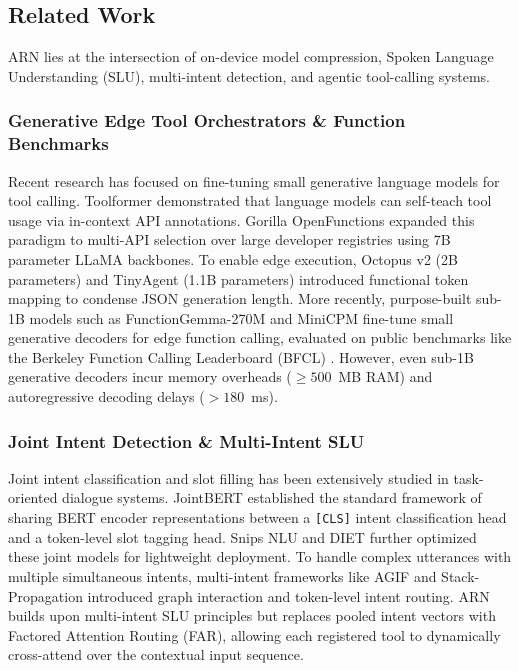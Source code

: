 \documentclass[conference]{IEEEtran}
\begin{document}
\subsection{Related Work}

ARN lies at the intersection of on-device model compression, Spoken Language Understanding (SLU), multi-intent detection, and agentic tool-calling systems.

\subsubsection{Generative Edge Tool Orchestrators \& Function Benchmarks}
Recent research has focused on fine-tuning small generative language models for tool calling. Toolformer \cite{schick2023toolformer} demonstrated that language models can self-teach tool usage via in-context API annotations. Gorilla OpenFunctions \cite{patil2023gorilla} expanded this paradigm to multi-API selection over large developer registries using 7B parameter LLaMA backbones. To enable edge execution, Octopus v2 \cite{chen2024octopus} (2B parameters) and TinyAgent \cite{erdogan2024tinyagent} (1.1B parameters) introduced functional token mapping to condense JSON generation length. More recently, purpose-built sub-1B models such as FunctionGemma-270M \cite{google2025functiongemma} and MiniCPM \cite{openbmb2024minicpm} fine-tune small generative decoders for edge function calling, evaluated on public benchmarks like the Berkeley Function Calling Leaderboard (BFCL) \cite{patil2025berkeley}. However, even sub-1B generative decoders incur memory overheads ($\ge 500$~MB RAM) and autoregressive decoding delays ($>180$~ms).

\subsubsection{Joint Intent Detection \& Multi-Intent SLU}
Joint intent classification and slot filling has been extensively studied in task-oriented dialogue systems. JointBERT \cite{chen2019bert} established the standard framework of sharing BERT encoder representations between a \texttt{[CLS]} intent classification head and a token-level slot tagging head. Snips NLU \cite{coucke2018snips} and DIET \cite{bunk2020diet} further optimized these joint models for lightweight deployment. To handle complex utterances with multiple simultaneous intents, multi-intent frameworks like AGIF \cite{xie2020agif} and Stack-Propagation \cite{qin2019stack} introduced graph interaction and token-level intent routing. ARN builds upon multi-intent SLU principles but replaces pooled intent vectors with Factored Attention Routing (FAR), allowing each registered tool to dynamically cross-attend over the contextual input sequence.
\end{document}
